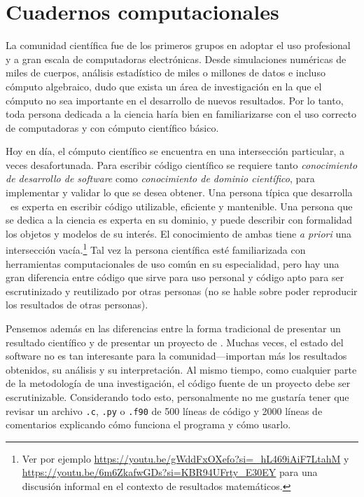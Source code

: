 \chapter{Cuadernos computacionales}

La comunidad científica fue de los primeros grupos en adoptar el uso profesional y a
gran escala de computadoras electrónicas.
Desde simulaciones numéricas de miles de cuerpos, análisis estadístico de miles
o millones de datos e incluso cómputo algebraico, dudo que exista un área de investigación
en la que el cómputo no sea importante en el desarrollo de nuevos resultados.
Por lo tanto, toda persona dedicada a la ciencia haría bien en familiarizarse con
el uso correcto de computadoras y con cómputo científico básico.

Hoy en día, el cómputo científico se encuentra en una intersección particular, a veces
desafortunada.
Para escribir código científico se requiere tanto \emph{conocimiento de desarrollo de software}
como \emph{conocimiento de dominio científico}, para implementar y validar lo que se desea
obtener.
Una persona típica que desarrolla \software~es experta en escribir código
utilizable, eficiente y mantenible.
Una persona que se dedica a la ciencia es experta en su dominio, y puede describir
con formalidad los objetos y modelos de su interés.
El conocimiento de ambas tiene \textit{a priori} una intersección vacía.\footnote{
  Ver por ejemplo
  \url{https://youtu.be/gWddFxOXefo?si=_hL469iAiF7LtahM} y
  \url{https://youtu.be/6m6ZkafwGDs?si=KBR94UFrty_E30EY}
  para una discusión informal en el contexto de resultados matemáticos.
}
Tal vez la persona científica esté familiarizada con herramientas computacionales de uso común
en su especialidad, pero hay una gran diferencia entre código que sirve para uso personal
y código apto para ser escrutinizado y reutilizado por otras personas (no se hable sobre
poder reproducir los resultados de otras personas).

Pensemos además en las diferencias entre la forma tradicional de presentar un resultado
científico y de presentar un proyecto de \software. Muchas veces, el estado del software
no es tan interesante para la comunidad---importan más los resultados obtenidos, su análisis
y su interpretación. Al mismo tiempo, como cualquier parte de la metodología de una
investigación, el código fuente de un proyecto debe ser escrutinizable.
Considerando todo esto, personalmente no me gustaría tener que revisar un archivo
\texttt{.c}, \texttt{.py} o \texttt{.f90} de \num{500} líneas de código y \num{2000} líneas
de comentarios explicando cómo funciona el programa y cómo usarlo.

